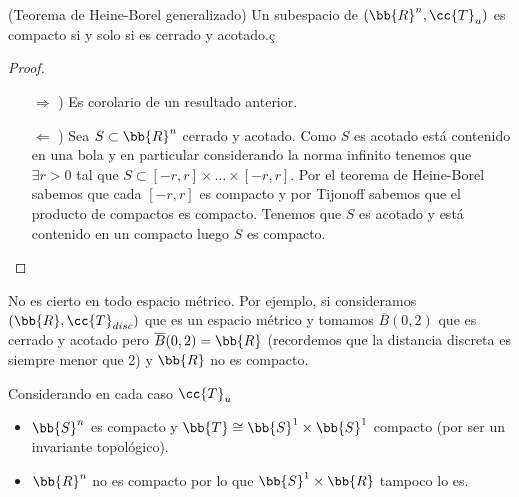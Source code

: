 \begin{teo}
    (Teorema de Heine-Borel generalizado) Un subespacio de $(\bb{R}^n, \cc{T}_u)$ es compacto si y solo si es cerrado y acotado.ç
    \begin{proof}\
        \begin{itemize}
            \item[$\Rightarrow$ )] Es corolario de un resultado anterior.
            \item[$\Leftarrow$ )] Sea $S\subset \bb{R}^n$ cerrado y acotado. Como $S$ es acotado está contenido en una bola y en particular considerando la norma infinito tenemos que $\exists r>0$ tal que $S\subset [-r,r]\times \dots\times [-r,r]$. Por el teorema de Heine-Borel sabemos que cada $[-r,r]$ es compacto y por Tijonoff sabemos que el producto de compactos es compacto. Tenemos que $S$ es acotado y está contenido en un compacto luego $S$ es compacto.  %
        \end{itemize}
    \end{proof}
\end{teo}

\begin{observacion}
    No es cierto en todo espacio métrico. Por ejemplo, si consideramos $(\bb{R}, \cc{T}_{disc})$ que es un espacio métrico y tomamos $\overline{B}(0,2)$ que es cerrado y acotado pero $\overline{B}(0,2)=\bb{R}$ (recordemos que la distancia discreta es siempre menor que 2) y $\bb{R}$ no es compacto.
    \endsquare
\end{observacion}

\begin{ejemplo}Considerando en cada caso $\cc{T}_u$
    \begin{itemize}
        \item $\bb{S}^n$ es compacto y $\bb{T}\cong \bb{S}^1\times \bb{S}^1$ compacto (por ser un invariante topológico).
        \item $\bb{R}^n$ no es compacto por lo que $\bb{S}^1\times \bb{R}$ tampoco lo es.
    \end{itemize}
    \endsquare
\end{ejemplo}

